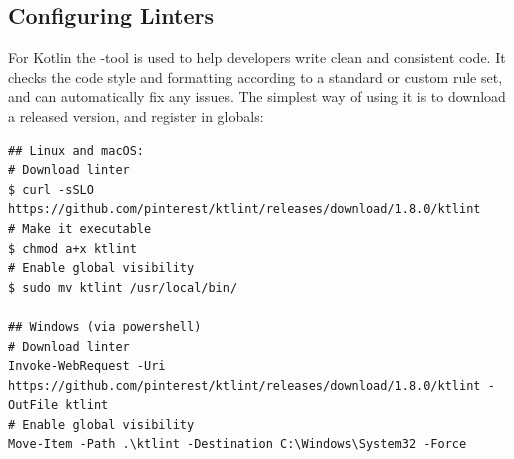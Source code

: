 
\subsection{Configuring Linters}

For Kotlin the -tool is used to help developers write clean and consistent code. It checks the code style and 
formatting according to a standard or custom rule set, and can automatically fix any issues. The simplest way of using 
it is to download a released version, and register in globals:

\begin{lstlisting}[language=terminal]
## Linux and macOS:
# Download linter
$ curl -sSLO https://github.com/pinterest/ktlint/releases/download/1.8.0/ktlint
# Make it executable
$ chmod a+x ktlint 
# Enable global visibility
$ sudo mv ktlint /usr/local/bin/

## Windows (via powershell)
# Download linter
Invoke-WebRequest -Uri https://github.com/pinterest/ktlint/releases/download/1.8.0/ktlint -OutFile ktlint
# Enable global visibility
Move-Item -Path .\ktlint -Destination C:\Windows\System32 -Force
\end{lstlisting}
